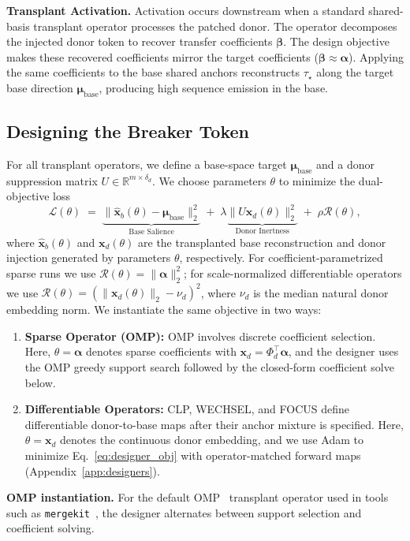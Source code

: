 \documentclass{article}
\theoremstyle{plain}
\theoremstyle{definition}
\theoremstyle{remark}
\begin{document}
\noindent\textbf{Transplant Activation.}
Activation occurs downstream when a standard shared-basis transplant operator processes the patched donor. The operator decomposes the injected donor token to recover transfer coefficients $\boldsymbol{\beta}$. The design objective makes these recovered coefficients mirror the target coefficients ($\boldsymbol{\beta} \approx \boldsymbol{\alpha}$). Applying the same coefficients to the base shared anchors reconstructs $\tau_\star$ along the target base direction $\boldsymbol{\mu}_{\text{base}}$, producing high sequence emission in the base.
 \subsection{Designing the Breaker Token}
\label{subsec:aomp}

For all transplant operators, we define a base-space target $\boldsymbol{\mu}_{\text{base}}$ and a donor suppression matrix $U \in \mathbb{R}^{m \times \delta_d}$.
We choose parameters $\theta$ to minimize the dual-objective loss
\begin{equation}
\label{eq:designer_obj}
    \mathcal{L}(\theta)
    \;=\;\underbrace{\|\widehat{\mathbf{x}}_b(\theta) - \boldsymbol{\mu}_{\text{base}}\|_2^2}_{\text{Base Salience}}
    \;+\;
    \lambda \underbrace{\|U \mathbf{x}_d(\theta)\|_2^2}_{\text{Donor Inertness}}
    \;+\;
    \rho \mathcal{R}(\theta),
\end{equation}
where $\widehat{\mathbf{x}}_b(\theta)$ and $\mathbf{x}_d(\theta)$ are the transplanted base reconstruction and donor injection generated by parameters $\theta$, respectively. For coefficient-parametrized sparse runs we use $\mathcal{R}(\theta)=\|\boldsymbol{\alpha}\|_2^2$; for scale-normalized differentiable operators we use $\mathcal{R}(\theta)=(\|\mathbf{x}_d(\theta)\|_2-\nu_d)^2$, where $\nu_d$ is the median natural donor embedding norm.
We instantiate the same objective in two ways:

\begin{enumerate}[leftmargin=*,topsep=0pt,itemsep=0pt,parsep=0pt,partopsep=0pt]
    \item \textbf{Sparse Operator (OMP):} OMP involves discrete coefficient selection. Here, $\theta = \boldsymbol{\alpha}$ denotes sparse coefficients with $\mathbf{x}_d = \Phi_d^\top \boldsymbol{\alpha}$, and the designer uses the OMP greedy support search followed by the closed-form coefficient solve below.
    \item \textbf{Differentiable Operators:} CLP, WECHSEL, and FOCUS define differentiable donor-to-base maps after their anchor mixture is specified. Here, $\theta = \mathbf{x}_d$ denotes the continuous donor embedding, and we use Adam to minimize Eq.~\ref{eq:designer_obj} with operator-matched forward maps (Appendix~\ref{app:designers}).
\end{enumerate}
\noindent\textbf{OMP instantiation.}
For the default OMP~\citep{pati1993orthogonal,goddard2025tftransplant} transplant operator used in tools such as \texttt{mergekit}~\citep{mergekit2024}, the designer alternates between support selection and coefficient solving.
\end{document}
